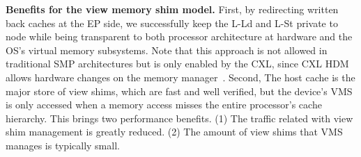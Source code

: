 





\ifx\undefined\stale
\noindent \textbf{Benefits for the view memory shim model. }
First, by redirecting written back caches at the EP side, we successfully keep the L-Ld and L-St private to node while being transparent to both processor architecture at hardware and the OS's virtual memory subsystems. 
Note that this approach is not allowed in traditional SMP architectures but is only enabled by the CXL, since CXL HDM allows hardware changes on the memory manager~\cite{neomem}. 
Second, The host cache is the major store of view shims, which are fast and well verified, but the device's VMS is only accessed when a memory access misses the entire processor's cache hierarchy. This brings two performance benefits. (1) The traffic related with view shim management is greatly reduced. (2) The amount of view shims that VMS manages is typically small. 
\fi

